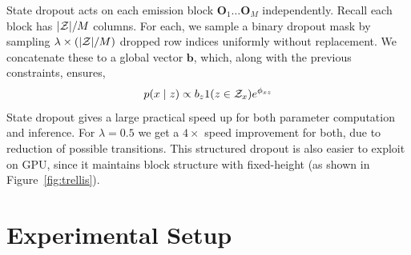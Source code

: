 \documentclass[11pt,a4paper]{article}
\begin{document}
State dropout acts on each emission block $\mathbf{O}_1 \ldots \mathbf{O}_M$ independently.
Recall each block has $|{\cal Z}| / M$ columns.
For each, we sample a binary dropout mask by sampling
$ \lambda \times(|{\cal Z}| / M)$ dropped row indices uniformly without replacement.
We concatenate these to a global vector $\mathbf{b}$, which, along with the previous constraints,  ensures,
\begin{equation}
\label{eqn:state_dropout}
p(x \mid z) \propto b_{z}1(z \in \mathcal{Z}_x)e^{\phi_{xz}}
\end{equation}
State dropout gives a large practical speed up for both parameter computation and inference.
For $\lambda=0.5$ we get a $4\times$ speed improvement for both,
due to reduction of possible transitions.
This structured dropout is also easier to exploit on GPU,
since it maintains block structure with fixed-height (as shown in Figure~\ref{fig:trellis}).










\section{Experimental Setup}
\label{sec:experiments}
\end{document}
